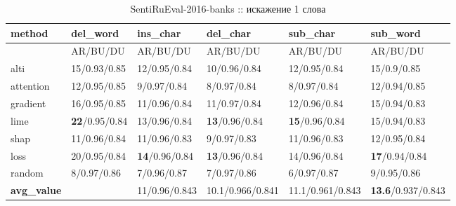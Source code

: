 \begin{table}[H]
  \centering
  \caption{SentiRuEval-2016-banks :: искажение 1 слова}
  {\renewcommand{\arraystretch}{1.5}
  {\fontsize{9pt}{10pt}\selectfont
  \begin{tabularx}{\textwidth}{|l|X|X|X|X|X|}
    \hline
     method    & del\_word         & ins\_char         & del\_char         & sub\_char         & sub\_word         \\
    \hline
     & AR/BU/DU & AR/BU/DU  & AR/BU/DU  & AR/BU/DU  & AR/BU/DU \\
    \hline
     alti      & 15/0.93/0.85 & 12/0.95/0.84 & 10/0.96/0.84 & 12/0.95/0.84 & 15/0.9/0.85 \\
    \hline
     attention & 12/0.95/0.85 & 9/0.97/0.84  & 8/0.97/0.84  & 8/0.97/0.84  & 12/0.94/0.85 \\
    \hline
     gradient  & 16/0.95/0.85 & 11/0.96/0.84 & 11/0.97/0.84 & 12/0.96/0.84 & 15/0.94/0.83 \\
    \hline
     lime      & \textbf{22}/0.95/0.84 & 13/0.96/0.84 & \textbf{13}/0.96/0.84 & \textbf{15}/0.96/0.84 & 15/0.94/0.83 \\
    \hline
     shap      & 11/0.96/0.84 & 11/0.96/0.83 & 9/0.97/0.83  & 11/0.96/0.83 & 12/0.95/0.84 \\
    \hline
     loss      & 20/0.95/0.84 & \textbf{14}/0.96/0.84 & \textbf{13}/0.96/0.84 & 14/0.96/0.84 & \textbf{17}/0.94/0.84 \\
    \hline
     random    & 8/0.97/0.86 & 7/0.96/0.87  & 7/0.97/0.86  & 6/0.97/0.87  & 9/0.95/0.86 \\
    \hline
     \textbf{avg\_value} & \cellcolor{gray!25} & 11/0.96/0.843 & 10.1/0.966/0.841 & 11.1/0.961/0.843 & \textbf{13.6}/0.937/0.843 \\
    \hline
    \end{tabularx}
    }
    }
\end{table}

